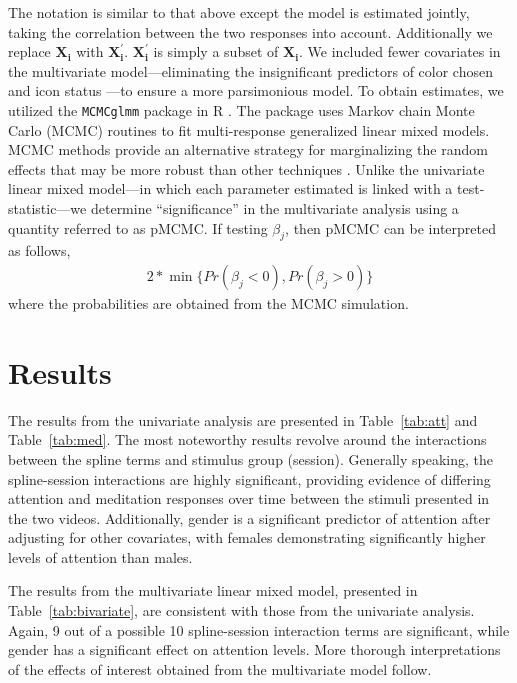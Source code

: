 \documentclass{article}[12pt]
\begin{document}
The notation is similar to that above except the model is estimated jointly, taking the correlation between the two responses into account. Additionally we replace $\mathbf{X_{i}}$  with $\mathbf{X^\prime_{i}}$.  $\mathbf{X^\prime_{i}} $ is simply a subset of $\mathbf{X_{i}}$. We included fewer covariates in the multivariate model---eliminating the insignificant predictors of color chosen and icon status ---to ensure a more parsimonious model. To obtain estimates, we utilized the \texttt{MCMCglmm} package in R \cite{mcmc}. The package uses Markov chain Monte Carlo (MCMC) routines to fit multi-response generalized linear mixed models. MCMC methods provide an alternative strategy for marginalizing the random effects that may be more robust than other techniques \cite{zhao06}. Unlike the univariate linear mixed model---in which each parameter estimated is linked with a test-statistic---we determine ``significance'' in the multivariate analysis using a quantity referred to as pMCMC. If testing $\beta_j$, then pMCMC can be interpreted as follows,
\begin{align}
	2*\min\{Pr(\beta_j < 0), Pr(\beta_j > 0)\}
\end{align}
where the probabilities are obtained from the MCMC simulation.



\section{Results}

The results from the univariate analysis are presented in Table~\ref{tab:att} and Table~\ref{tab:med}. The most noteworthy results revolve around the interactions between the spline terms and stimulus group (session). Generally speaking, the spline-session interactions are highly significant, providing evidence of differing attention and meditation responses over time between the stimuli presented in the two videos. Additionally, gender is a significant predictor of attention after adjusting for other covariates, with females demonstrating significantly higher levels of attention than males.





The results from the multivariate linear mixed model, presented in Table~\ref{tab:bivariate}, are consistent with those from the univariate analysis. Again, 9 out of a possible 10 spline-session interaction terms  are significant, while gender has a significant effect on attention levels. More thorough interpretations of the effects of interest obtained from the multivariate model follow.
\end{document}
